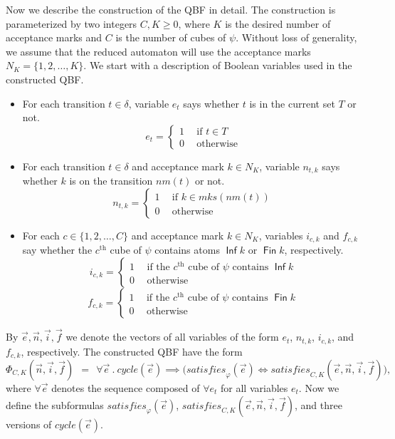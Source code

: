 \documentclass[a4paper,UKenglish,cleveref,autoref,thm-restate]{lipics-v2021}
\DeclareMathOperator{\Inf}{\mathsf{Inf}}
\DeclareMathOperator{\Fin}{\mathsf{Fin}}
\newcommand{\mks}{\mathit{mks}}
\newcommand{\rem}{\mathit{nm}}
\newcommand{\mcycle}{\mathit{cycle}}
\newcommand{\msat}{\mathit{satisfies}}
\begin{document}
Now we describe the construction of the QBF in detail. The
construction is parameterized by two integers $C,K\ge 0$, where $K$ is
the desired number of acceptance marks and $C$ is the number of cubes
of $\psi$. Without loss of generality, we assume that the reduced
automaton will use the acceptance marks $N_K=\{1,2,\ldots,K\}$.
We start with a description of Boolean variables used in the
constructed QBF.
\begin{itemize}
\item For each transition $t\in\delta$, variable $e_t$ says whether
  $t$ is in the current set $T$ or not.
  \[e_t=\left\{
      \begin{array}{ll}
        1~~ & \textrm{if }t\in T\\[.5ex]
        0 & \textrm{otherwise}    
      \end{array}\right.
  \]
\item For each transition $t\in\delta$ and acceptance mark $k\in N_K$,
  variable $n_{t,k}$ says whether $k$ is on the transition
  $\rem(t)$ or not.
  \[n_{t,k}=\left\{
      \begin{array}{ll}
        1~~ & \textrm{if }k\in\mks(\rem(t))\\[.5ex]
        0 & \textrm{otherwise}    
      \end{array}\right.
  \]
\item For each $c\in\{1,2,\ldots,C\}$ and acceptance mark $k\in N_K$,
  variables $i_{c,k}$ and $f_{c,k}$ say whether the $c^\textrm{th}$
  cube of $\psi$ contains atoms $\Inf k$ or $\Fin k$, respectively.
  \[i_{c,k}=\left\{
      \begin{array}{ll}
        1~~ & \textrm{if the $c^\textrm{th}$ cube of $\psi$ contains $\Inf k$}\\[.5ex]
        0 & \textrm{otherwise}    
      \end{array}\right.
  \]
  \[f_{c,k}=\left\{
      \begin{array}{ll}
        1~~ & \textrm{if the $c^\textrm{th}$ cube of $\psi$ contains $\Fin k$}\\[.5ex]
        0 & \textrm{otherwise}    
      \end{array}\right.
  \]

\end{itemize}
By $\vec{e},\vec{n},\vec{i},\vec{f}$ we denote the vectors of all
variables of the form $e_t$, $n_{t,k}$, $i_{c,k}$, and $f_{c,k}$,
respectively. The constructed QBF have the form
\[
  \Phi_{C,K}(\vec{n},\vec{i},\vec{f})~~=~~\forall \vec{e}~.~\mcycle(\vec{e})\implies\big(\msat_\varphi(\vec{e}) \iff \msat_{C,K}(\vec{e},\vec{n},\vec{i},\vec{f})\big),
\]
where $\forall\vec{e}$ denotes the sequence composed of $\forall e_t$
for all variables $e_t$. Now we define the subformulas
$\msat_\varphi(\vec{e})$,
$\msat_{C,K}(\vec{e},\vec{n},\vec{i},\vec{f})$, and three versions of
$\mcycle(\vec{e})$.
\end{document}
